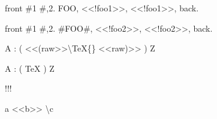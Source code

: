 
front \#1 \#,2. FOO, <<!foo1>>, <<!foo1>>, back.\mktsShowpar\par
front \#1 \#,2. \#FOO\#, <<!foo2>>, <<!foo2>>, back.\mktsShowpar\par
A : ( <<(raw>>\textbackslash{}TeX\{\} <<raw)>> ) Z\mktsShowpar\par
A : ( \TeX{}  ) Z\mktsShowpar\par
[first value]\mktsShowpar\par
[second value]\mktsShowpar\par
[second value]!!!\mktsShowpar\par
a <<b>> \textbackslash{}c

